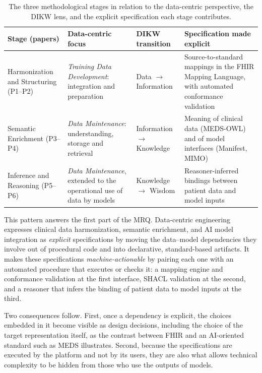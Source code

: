 \begin{table}[htpb]
\caption{The three methodological stages in relation to the data-centric perspective, the DIKW lens, and the explicit specification each stage contributes.}
\label{tab:conclusions_framework}
\small
\begin{tabularx}{\textwidth}{>{\raggedright\arraybackslash}p{3.0cm} >{\raggedright\arraybackslash}p{3.4cm} >{\raggedright\arraybackslash}p{2.4cm} >{\raggedright\arraybackslash}X}
\toprule
\textbf{Stage (papers)} & \textbf{Data-centric focus} & \textbf{DIKW transition} & \textbf{Specification made explicit} \\
\midrule
Harmonization and Structuring (P1--P2) & \emph{Training Data Development}: integration and preparation & Data $\rightarrow$ Information & Source-to-standard mappings in the FHIR Mapping Language, with automated conformance validation \\
Semantic Enrichment (P3--P4) & \emph{Data Maintenance}: understanding, storage and retrieval & Information $\rightarrow$ Knowledge & Meaning of clinical data (MEDS-OWL) and of model interfaces (Manifest, MIMO) \\
Inference and Reasoning (P5--P6) & \emph{Data Maintenance}, extended to the operational use of data by models & Knowledge $\rightarrow$ Wisdom & Reasoner-inferred bindings between patient data and model inputs \\
\bottomrule
\end{tabularx}
\end{table}

This pattern answers the first part of the MRQ. Data-centric engineering expresses clinical data harmonization, semantic enrichment, and AI model integration as \emph{explicit} specifications by moving the data--model dependencies they involve out of procedural code and into declarative, standard-based artifacts. It makes these specifications \emph{machine-actionable} by pairing each one with an automated procedure that executes or checks it: a mapping engine and conformance validation at the first interface, SHACL validation at the second, and a reasoner that infers the binding of patient data to model inputs at the third.

Two consequences follow. First, once a dependency is explicit, the choices embedded in it become visible as design decisions, including the choice of the target representation itself, as the contrast between FHIR and an AI-oriented standard such as MEDS illustrates. Second, because the specifications are executed by the platform and not by its users, they are also what allows technical complexity to be hidden from those who use the outputs of models.

